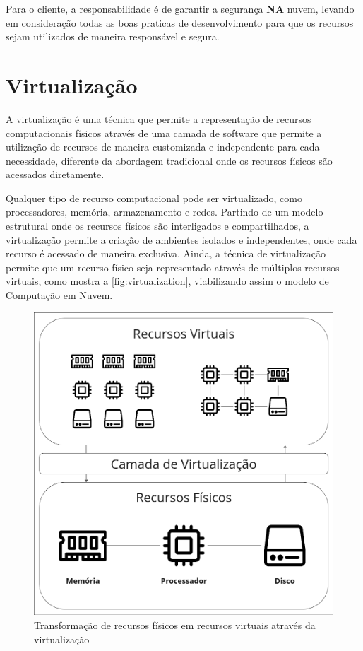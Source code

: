 Para o cliente, a responsabilidade é de garantir a segurança \textbf{NA} nuvem, levando em consideração todas as boas praticas de desenvolvimento para que os recursos sejam utilizados de maneira responsável e segura.

\section{Virtualização}
\label{sec:virtualization}

A virtualização é uma técnica que permite a representação de recursos computacionais físicos através de uma camada de software que permite a utilização de recursos de maneira customizada e independente para cada necessidade, diferente da abordagem tradicional onde os recursos físicos são acessados diretamente. \citep{cloudcomputingcambridge}

Qualquer tipo de recurso computacional pode ser virtualizado, como processadores, memória, armazenamento e redes. Partindo de um modelo estrutural onde os recursos físicos são interligados e compartilhados, a virtualização permite a criação de ambientes isolados e independentes, onde cada recurso é acessado de maneira exclusiva. Ainda, a técnica de virtualização permite que um recurso físico seja representado através de múltiplos recursos virtuais, como mostra a \autoref{fig:virtualization}, viabilizando assim o modelo de Computação em Nuvem. \citep{cloudcomputingcambridge}

\begin{figure}[H]
\captionsetup{width=.7\textwidth}%
\caption{Transformação de recursos físicos em recursos virtuais através da virtualização}
\label{fig:virtualization}
\includegraphics[width=.7\textwidth]{capitulos/1-revisao-da-literatura/files/virtualization-layers.png}
\end{figure}

